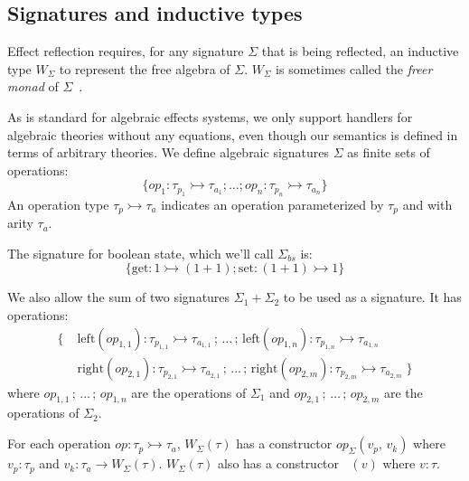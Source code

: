 \documentclass[acmsmall, screen, review, anonymous]{acmart}
\theoremstyle{definition}
\newcommand{\ind}[1]{W_{#1}}
\newcommand{\indintro}[4]{#2_{#1}(#3,\, #4)}
\newcommand{\retname}{\mathrm{ret}}
\newcommand{\ret}[2]{\mathop{\retname_{#1}}(#2)}
\newcommand{\seq}{\,;\,}
\newcommand{\types}{\mathrel{:}}
\begin{document}
\subsection{Signatures and inductive types}

Effect reflection requires, for any signature $\Sigma$ that is being
reflected, an inductive type $\ind{\Sigma}$ to represent the free
algebra of $\Sigma$. $\ind{\Sigma}$ is sometimes called the \emph{freer
  monad} of $\Sigma$~\cite{kiselyov2015freer}.

As is standard for algebraic effects systems, we only support handlers
for algebraic theories without any equations, even though our semantics
is defined in terms of arbitrary theories. We define algebraic
signatures $\Sigma$ as finite sets of operations:
\begin{equation*}
\{ op_1 \types \tau_{p_1} \rightarrowtail \tau_{a_1}; \ldots; op_n
\types \tau_{p_n} \rightarrowtail \tau_{a_n} \}
\end{equation*}
An operation type $\tau_p \rightarrowtail \tau_a$ indicates an operation
parameterized by $\tau_p$ and with arity $\tau_a$.

\begin{example}
  The signature for boolean state, which we'll call $\Sigma_{bs}$
  is:
  \begin{equation*}
    \{ \mathrm{get} \types 1 \rightarrowtail (1 + 1);
       \mathrm{set} \types (1 + 1) \rightarrowtail 1 \}
  \end{equation*}
\end{example}

We also allow the sum of two signatures $\Sigma_1 + \Sigma_2$ to be used
as a signature. It has operations:
\begin{align*}
\{ \; &\mathrm{left}(op_{1,1}) \types \tau_{p_{1,1}} \rightarrowtail \tau_{a_{1,1}} \seq
        \ldots \seq
        \mathrm{left}(op_{1, n}) \types \tau_{p_{1, n}} \rightarrowtail \tau_{a_{1, n}} \\
      &\mathrm{right}(op_{2, 1}) \types \tau_{p_{2, 1}} \rightarrowtail \tau_{a_{2,1}} \seq
        \ldots \seq
        \mathrm{right}(op_{2, m}) \types \tau_{p_{2, m}} \rightarrowtail \tau_{a_{2, m}}
        \; \}
\end{align*}
where $op_{1,1} \seq \ldots \seq op_{1,n}$ are the operations of
$\Sigma_1$ and $op_{2,1} \seq \ldots \seq op_{2,m}$ are the operations
of $\Sigma_2$.

For each operation $op \types \tau_p \rightarrowtail \tau_a$,
$\ind{\Sigma}(\tau)$ has a constructor $\indintro{\Sigma}{op}{v_p}{v_k}$
where $v_p \types \tau_p$ and
$v_k \types \tau_a \rightarrow \ind{\Sigma}(\tau)$. $\ind{\Sigma}(\tau)$
also has a constructor $\ret{\Sigma}{v}$ where $v \types \tau$.
\end{document}
